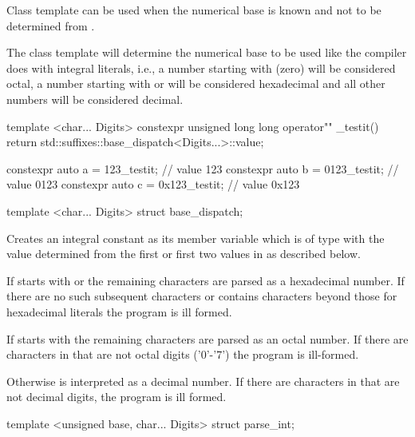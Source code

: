 \documentclass[ebook,11pt,article]{memoir}
\begin{document}
\pnum
Class template  can be used when the numerical base is known and not to be determined from .

\pnum
The class template  will determine the numerical base to be used like the compiler does with integral literals, i.e., a number starting with  (zero) will be considered octal, a number starting with  or  will be considered hexadecimal and all other numbers will be considered decimal.

\pnum
\enterexample
\begin{codeblock}
template <char... Digits>
constexpr  unsigned long long
operator"" _testit(){
    return std::suffixes::base_dispatch<Digits...>::value;
}

constexpr auto a = 123_testit;   // value 123
constexpr auto b = 0123_testit;  // value 0123
constexpr auto c = 0x123_testit; // value 0x123

\end{codeblock}
\exitexample

\begin{itemdecl}
template <char... Digits>
struct base_dispatch;
\end{itemdecl}

\begin{itemdescr}
\pnum
\effects
Creates an integral constant as its  member variable  which is of type  with the value determined from the first or first two  values in  as described below.

\pnum
If  starts with  or  the remaining characters are parsed as a hexadecimal number. If there are no such subsequent characters or  contains characters beyond those for hexadecimal literals the program is ill formed.

\pnum
If  starts with  the remaining characters are parsed as an octal number. If there are characters in  that are not octal digits ('0'-'7') the program is ill-formed.

\pnum
Otherwise  is interpreted as a decimal number. If there are characters in  that are not decimal digits, the program is ill formed.
\end{itemdescr}

\begin{itemdecl}
template <unsigned base, char... Digits>
struct parse_int;
\end{itemdecl}
\end{document}
